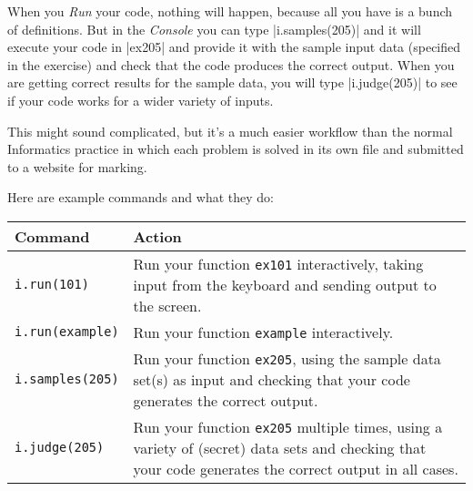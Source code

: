 When you \emph{Run} your code, nothing will happen, because all you have is a bunch of
definitions. But in the \emph{Console} you can type \pycode|i.samples(205)| and it will
execute your code in \pycode|ex205| and provide it with the sample input data (specified
in the exercise) and check that the code produces the correct output. When you are getting
correct results for the sample data, you will type \pycode|i.judge(205)| to see if your
code works for a wider variety of inputs.

This might sound complicated, but it's a much easier workflow than the normal Informatics
practice in which each problem is solved in its own file and submitted to a website for
marking.

Here are example commands and what they do:
\begin{center}
  \begin{tabular}{lp{10cm}}
    \toprule
    \textbf{Command} & \textbf{Action} \\
    \midrule
    \texttt{i.run(101)}     & Run your function \texttt{ex101} interactively, taking
                              input from the keyboard and sending output to the
                              screen.\\[3pt]
    \texttt{i.run(example)} & Run your function \texttt{example} interactively.\\[3pt]
    \texttt{i.samples(205)} & Run your function \texttt{ex205}, using the sample data
                              set(s) as input and checking that your code generates
                              the correct output.\\[3pt]
    \texttt{i.judge(205)}   & Run your function \texttt{ex205} multiple times, using a
                              variety of (secret) data sets and checking that your code
                              generates the correct output in all cases.\\
    \bottomrule
  \end{tabular}
\end{center}

